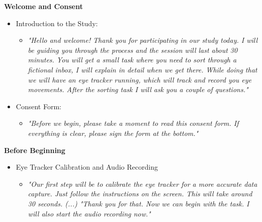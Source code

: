 \documentclass[
  a4paper,  %
  twoside,  %
  bibliography=totoc,
  headsepline,
  cleardoublepage=empty,
  parskip=half,
  draft=false
]{scrbook}
\begin{document}
\textbf{Welcome and Consent}
\begin{itemize}
    \item Introduction to the Study: 
    \begin{itemize}
        \item[ ]\textit{"Hello and welcome! Thank you for participating in our study today.  I will be guiding you through the process and the session will last about 30 minutes. You will get a small task where you need to sort through a fictional inbox, I will explain in detail when we get there. While doing that we will have an eye tracker running, which will track and record you eye movements. After the sorting task I will ask you a couple of questions."}
    \end{itemize}
\newpage
    \item Consent Form:
        \begin{itemize}
            \item[ ]\textit{ "Before we begin, please take a moment to read this consent form. If everything is clear, please sign the form at the bottom."}
        \end{itemize}
        
\end{itemize}

\textbf{Before Beginning}
\begin{itemize}
    \item Eye Tracker Calibration and Audio Recording
        \begin{itemize}
            \item[] \textit{"Our first step will be to calibrate the eye tracker for a more accurate data capture. Just follow the instructions on the screen. This will take around 30 seconds. (...) "Thank you for that. Now we can begin with the task. I will also start the audio recording now."}
        \end{itemize}
\end{itemize}
\end{document}
